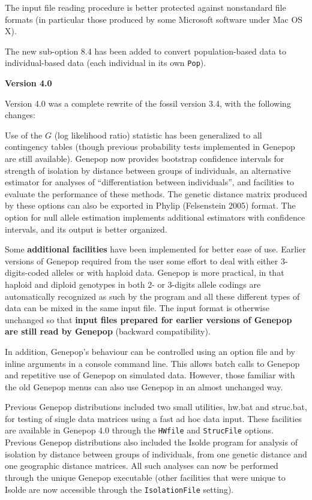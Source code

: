 \documentclass[
  12pt,
]{book}
\begin{document}
The input file reading procedure is better protected against nonstandard file formats (in particular those produced by some Microsoft software under Mac OS X).

The new sub-option 8.4 has been added to convert population-based data to individual-based data (each individual in its own \texttt{Pop}).

\textbf{Version 4.0}

Version 4.0 was a complete rewrite of the fossil version 3.4, with the following changes:

Use of the \(G\) (log likelihood ratio) statistic has been generalized to all contingency tables (though previous probability tests implemented in Genepop are still available). Genepop now provides bootstrap confidence intervals for strength of isolation by distance between groups of individuals, an alternative estimator for analyses of ``differentiation between individuals'', and facilities to evaluate the performance of these methods. The genetic distance matrix produced by these options can also be exported in Phylip (Felsenstein 2005) format. The option for null allele estimation implements additional estimators with confidence intervals, and its output is better organized.

Some \textbf{additional facilities} have been implemented for better ease of use. Earlier versions of Genepop required from the user some effort to deal with either 3-digits-coded  alleles or with haploid data. Genepop is more practical, in that haploid  and diploid genotypes in both 2- or 3-digits allele codings are automatically recognized as such by the program and all these different types of data can be mixed in the same input file. The input format is otherwise unchanged so that \textbf{input files prepared for earlier versions of Genepop are still read by Genepop} (backward compatibility).

In addition, Genepop's behaviour can be controlled using an option file and by inline arguments in a console command line. This allows batch calls to Genepop and repetitive use of Genepop on simulated data. However, those familiar with the old Genepop menus can also use Genepop in an almost unchanged way.

Previous Genepop distributions included two small utilities, hw.bat  and struc.bat,  for testing of single data matrices using a fast ad hoc data input. These facilities are available in Genepop 4.0 through the \texttt{HWfile}  and \texttt{StrucFile} options.  Previous Genepop distributions also included the Isolde  program for analysis of isolation by distance between groups of individuals, from one genetic distance and one geographic distance matrices. All such analyses can now be performed through the unique Genepop executable (other facilities that were unique to Isolde are now accessible through the \texttt{IsolationFile} setting).
\end{document}
